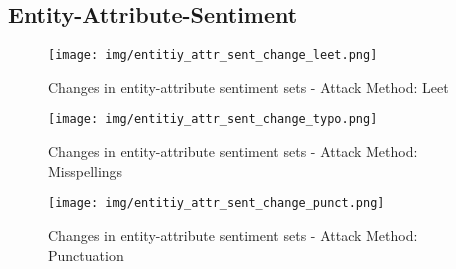 \subsection{Entity-Attribute-Sentiment}
\begin{figure}
    \centering
    \texttt{[image: img/entitiy\_attr\_sent\_change\_leet.png]}
    \caption{Changes in entity-attribute sentiment sets - Attack Method: Leet}
    \label{fig:entity_attr_sent_change_leet}
\end{figure}

\begin{figure}
    \centering
    \texttt{[image: img/entitiy\_attr\_sent\_change\_typo.png]}
    \caption{Changes in entity-attribute sentiment sets - Attack Method: Misspellings}
    \label{fig:entity_attr_sent_change_typo}
\end{figure}

\begin{figure}
    \centering
    \texttt{[image: img/entitiy\_attr\_sent\_change\_punct.png]}
    \caption{Changes in entity-attribute sentiment sets - Attack Method: Punctuation}
    \label{fig:entity_attr_sent_change_punct}
\end{figure}